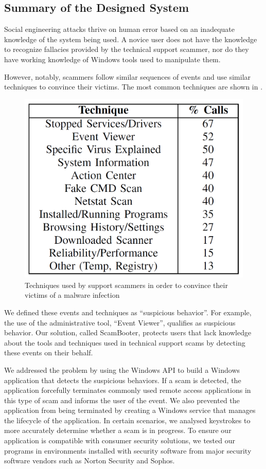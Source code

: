 \documentclass[final]{IEEEtran}
\begin{document}
\subsection{Summary of the Designed System}
Social engineering attacks thrive on human error based on an inadequate knowledge of the system being used. A novice user does not have the knowledge to recognize fallacies provided by the technical support scammer, nor do they have working knowledge of Windows tools used to manipulate them.

However, notably, scammers follow similar sequences of events and use similar techniques to convince their victims. The most common techniques are shown in \cite[Fig 4]{b2}.
\begin{figure}[htbp]
\centerline{\includegraphics[keepaspectratio=true, scale = 0.20]{image3.png}}
\caption{Techniques used by support scammers in order to convince their victims of a malware infection}
\label{fig4}
\end{figure}

We defined these events and techniques as ``suspicious behavior''. For example, the use of the administrative tool, ``Event Viewer'', qualifies as suspicious behavior. Our solution, called ScamBooter, protects users that lack knowledge about the tools and techniques used in technical support scams by detecting these events on their behalf.

We addressed the problem by using the Windows API to build a Windows application that detects the suspicious behaviors. If a scam is detected, the application forcefully terminates commonly used remote access applications in this type of scam and informs the user of the event. We also prevented the application from being terminated by creating a Windows service that manages the lifecycle of the application. In certain scenarios, we analysed keystrokes to more accurately determine whether a scam is in progress. To ensure our application is compatible with consumer security solutions, we tested our programs in environments installed with security software from major security software vendors such as Norton Security and Sophos.
\end{document}
